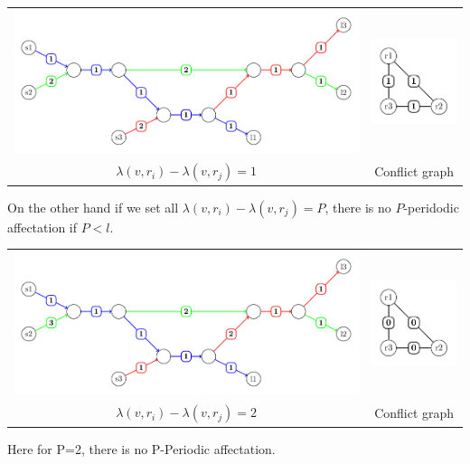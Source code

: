 \documentclass{article}
\begin{document}
\begin{tabular}{cc}
\includegraphics[scale=0.5]{Fig5.pdf} & \includegraphics[scale=1]{Fig7.pdf}\\
 $\lambda(v,r_i) - \lambda(v,r_j)=1$ & Conflict graph\\
\end{tabular}\newline

On the other hand if we set all $\lambda(v,r_i) - \lambda(v,r_j)=P$, there is no $P$-peridodic affectation if $P<l$.

\begin{tabular}{cc}
\includegraphics[scale=0.5]{Fig6.pdf} & \includegraphics[scale=1]{Fig8.pdf}\\
 $\lambda(v,r_i) - \lambda(v,r_j)=2$ & Conflict graph\\
\end{tabular}\newline
\begin{center}
 Here for P=2, there is no P-Periodic affectation.
\end{center}
\end{document}
